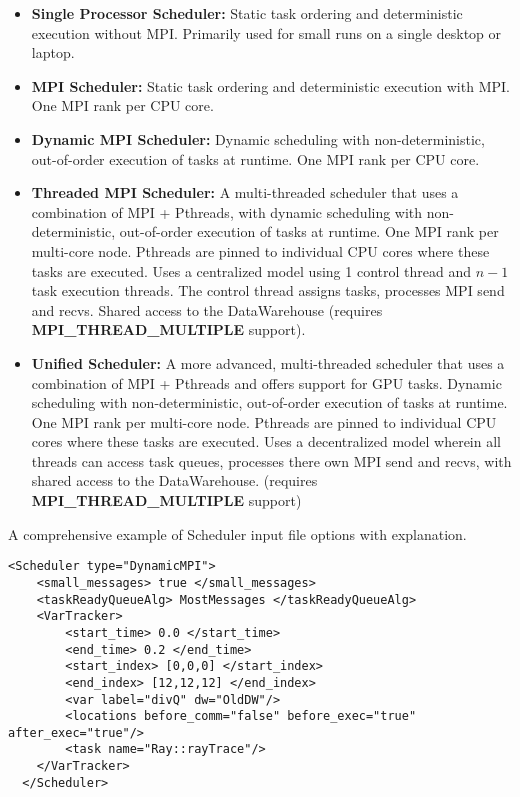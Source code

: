\begin{itemize}
  \item \textbf{Single Processor Scheduler:} Static task ordering and
      deterministic execution without MPI. Primarily used for small runs on
      a
      single desktop or laptop.
  \item \textbf{MPI Scheduler:} Static task ordering and deterministic
      execution with MPI. One MPI rank per CPU core.
  \item \textbf{Dynamic MPI Scheduler:} Dynamic scheduling with
      non-deterministic, out-of-order execution of tasks at runtime. One MPI
      rank per CPU core.
  \item \textbf{Threaded MPI Scheduler:} A multi-threaded scheduler that uses
      a combination of MPI + Pthreads, with dynamic scheduling with
      non-deterministic, out-of-order execution of tasks at runtime. One MPI
      rank per multi-core node. Pthreads are pinned to individual CPU cores
      where these tasks are executed. Uses a centralized model using 1
      control thread and $n-1$ task execution threads. The control thread
      assigns tasks, processes MPI send and recvs. Shared access to the
      DataWarehouse (requires \textbf{MPI\_THREAD\_MULTIPLE} support).
  \item \textbf{Unified Scheduler:} A more advanced, multi-threaded scheduler
      that uses a combination of MPI + Pthreads and offers support for GPU
      tasks. Dynamic scheduling with non-deterministic, out-of-order
      execution of tasks at runtime. One MPI rank per multi-core node.
      Pthreads are pinned to individual CPU cores where these tasks are
      executed. Uses a decentralized model wherein all threads can access
      task queues, processes there own MPI send and recvs, with shared access
      to the DataWarehouse. (requires \textbf{MPI\_THREAD\_MULTIPLE}
      support)
\end{itemize}

\noindent A comprehensive example of Scheduler input file options with
explanation.

\begin{Verbatim}[fontsize=\footnotesize]
  <Scheduler type="DynamicMPI">
    <small_messages> true </small_messages>
    <taskReadyQueueAlg> MostMessages </taskReadyQueueAlg>
    <VarTracker>
        <start_time> 0.0 </start_time>
        <end_time> 0.2 </end_time>
        <start_index> [0,0,0] </start_index>
        <end_index> [12,12,12] </end_index>
        <var label="divQ" dw="OldDW"/>
        <locations before_comm="false" before_exec="true" after_exec="true"/>
        <task name="Ray::rayTrace"/>
    </VarTracker>
  </Scheduler>
\end{Verbatim}

